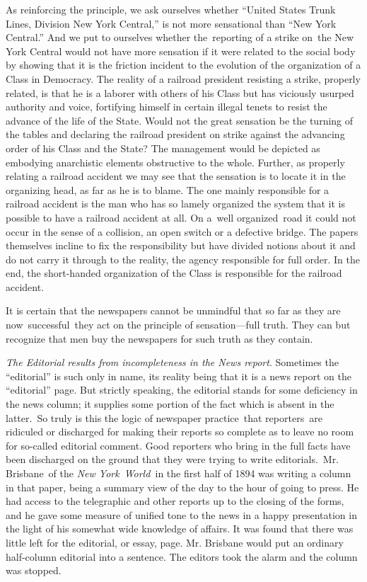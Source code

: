 \documentclass[twoside,symmetric,nobib,justified]{tufte-book}
\begin{document}
As reinforcing the principle, we ask ourselves whether ``United States
Trunk Lines, Division New York Central,'' is not more sensational
than ``New York Central.'' And we put to ourselves whether the~reporting
of a strike on~the New York Central would not have more sensation if it
were related to the social body by showing that it is the friction
incident to the evolution of the organization of a Class in Democracy.
The reality of a railroad president resisting a strike, properly
related, is that he is a laborer with others of his Class but has
viciously usurped authority and voice, fortifying himself in certain
illegal tenets to resist the advance of the life of the State. Would not
the great sensation be the turning of the tables and declaring the
railroad president on strike against the advancing order of his Class
and the State? The management would be depicted as embodying anarchistic
elements obstructive to the whole. Further, as properly relating a
railroad accident we may see that the sensation is to locate it in the
organizing head, as far as he is to blame. The one mainly responsible
for a railroad accident is the man who has so lamely organized the
system that it is possible to have a railroad accident at all. On a~well
organized~road it could not occur in the sense of a collision, an open
switch or a defective bridge. The papers themselves incline to fix the
responsibility but have divided notions about it and do not carry it
through to the reality, the agency responsible for full order. In the
end, the short-handed organization of the Class is responsible for the
railroad accident.~

It is certain that the newspapers cannot be unmindful that so far as
they are now~successful~they act on the principle of sensation---full
truth. They can but recognize that men buy the newspapers for such truth
as they contain.~

\vspace{0.05in}

\emph{The Editorial results from incompleteness in the News report}.
Sometimes the ``editorial'' is such only in name, its reality being that
it is a news report on the ``editorial'' page. But strictly speaking,
the editorial stands for some deficiency in the news column; it supplies
some portion of the fact which is absent in the latter.~So truly is this
the logic of newspaper practice~that reporters~are ridiculed or
discharged for making their reports so complete as to leave no room for
so-called editorial comment. Good reporters who bring in the full facts
have been discharged on the ground that they were trying to write
editorials.~Mr. Brisbane~of the \emph{New York}~\emph{World~}in the
first half of 1894 was writing a column in that paper, being a summary
view of the day to the hour of going to press. He had access to the
telegraphic and other reports up to the closing of the forms, and he
gave some measure of unified tone to the news in a happy presentation in
the light of his somewhat wide knowledge of affairs. It was found that
there was little left for the editorial, or essay, page. Mr. Brisbane
would put an ordinary half-column editorial into a sentence. The editors
took the alarm and the column was stopped.~
\end{document}
